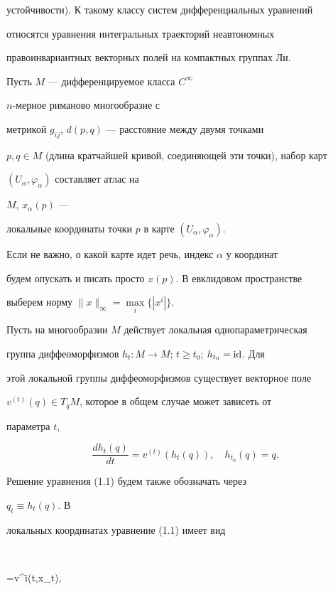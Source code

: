 устойчивости). К такому классу систем дифференциальных уравнений 


относятся уравнения интегральных траекторий неавтономных 


правоинвариантных векторных полей на компактных группах Ли. 


 


Пусть $M$ --- дифференцируемое класса $C^\infty$\;


$n$-мерное риманово многообразие с 


метрикой $g_{ij}$, $d(p,q)$ --- расстояние между двумя точками 


$p,q\in M$ (длина кратчайшей кривой, соединяющей эти точки), набор карт 


$(U_\alpha,\varphi_\alpha)$ составляет атлас на


$M$, $x_\alpha(p)$ ---


локальные координаты точки $p$ в карте $(U_\alpha,\varphi_\alpha)$. 


Если не важно, о какой карте идет речь, индекс $\alpha$ у координат 


будем опускать и писать просто $x(p)$. В евклидовом пространстве 


выберем норму $\|x\|_\infty=\max\limits_i\{|x^i|\}$. 


 


Пусть на многообразии $M$ действует локальная однопараметрическая 


группа диффеоморфизмов $h_t:M\to M$; $t\ge t_0$; $h_{t_0}=\operatorname{id}$. Для 


этой локальной группы диффеоморфизмов существует векторное поле 


$v^{(t)}(q)\in T_q M$, которое в общем случае может зависеть от 


параметра $t$,


\begin{equation} 


\frac{d h_t(q)}{d t}=v^{(t)}(h_t(q)),\quad 


h_{t_0}(q)=q. 


\end{equation} 


Решение уравнения (1.1) будем также обозначать через 


$q_t\equiv h_t(q)$. В 


локальных координатах уравнение (1.1) имеет вид 


$$ 


=v^i(t,x_t),\quad 



